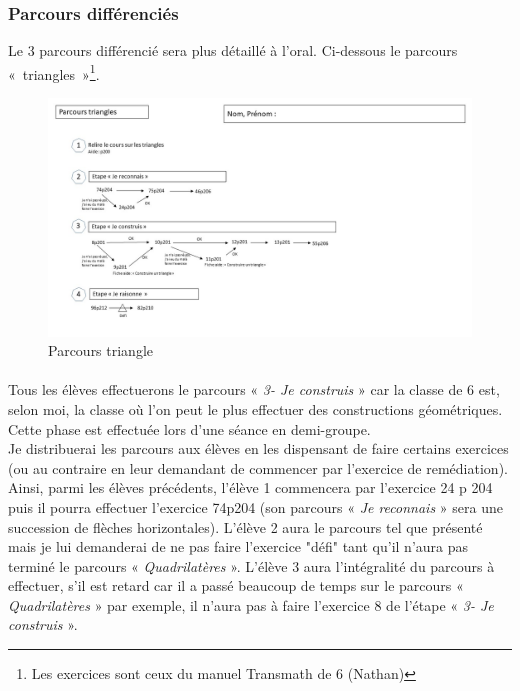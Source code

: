 \subsubsection*{Parcours différenciés}\label{parcours_diff3}
Le 3 parcours différencié sera plus détaillé à l'oral. Ci-dessous le parcours « triangles »\footnote{Les exercices sont ceux du manuel Transmath de 6\up{} (Nathan)}.
\begin{figure}[!h]
	\centering
	\includegraphics[scale=0.4]{img/parcours_triangles.jpg}
	\caption{Parcours triangle}
\end{figure}
\paragraph{}Tous les élèves effectuerons le parcours « \textit{3- Je construis} » car la classe de 6 est, selon moi, la classe où l'on peut le plus effectuer des constructions géométriques. Cette phase est effectuée lors d'une séance en demi-groupe.\\
Je distribuerai les parcours aux élèves en les dispensant de faire certains exercices (ou au contraire en leur demandant de commencer par l'exercice de remédiation).\\
Ainsi, parmi les élèves précédents, l'élève 1 commencera par l'exercice 24 p 204 puis il pourra effectuer l'exercice 74p204 (son parcours « \textit{Je reconnais} » sera une succession de flèches horizontales). L'élève 2 aura le parcours tel que présenté mais je lui demanderai de ne pas faire l'exercice "défi" tant qu'il n'aura pas terminé le parcours « \textit{Quadrilatères} ». L'élève 3 aura l'intégralité du parcours à effectuer, s'il est retard car il a passé beaucoup de temps sur le parcours « \textit{Quadrilatères} » par exemple, il n'aura pas à faire l'exercice 8 de l'étape « \textit{3- Je construis} ».
